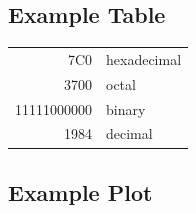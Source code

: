 \documentclass[%
]{tumDiss}
\begin{document}
\lipsum[1-2]
\lipsum[66]



\subsection{Example Table}

\lipsum[1]

\begin{table}[thb]
    \renewcommand{\arraystretch}{1.3}
    \label{table:example_table}
    \centering

    \begin{tabular}{|r|l|}
      \hline
      7C0         & hexadecimal \\
      3700        & octal \\
      \cline{2-2}
      11111000000 & binary \\
      \hline
      \hline
      1984        & decimal \\
      \hline
    \end{tabular}
\end{table}


\lipsum[2-4]



\subsection{Example Plot}

\lipsum[1]
\end{document}

